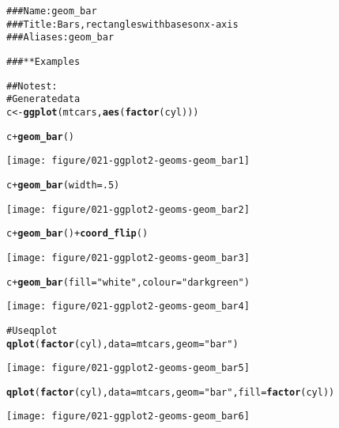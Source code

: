 \documentclass[a4paper,titlepage]{tufte-handout}\usepackage{graphicx, color}
\makeatletter
\def\maxwidth{ %
  \ifdim\Gin@nat@width>\linewidth
    \linewidth
  \else
    \Gin@nat@width
  \fi
}
\newcommand{\hlfunctioncall}[1]{\textcolor[rgb]{0.501960784313725,0,0.329411764705882}{\textbf{#1}}}%
\newcommand{\hlstring}[1]{\textcolor[rgb]{0.6,0.6,1}{#1}}%
\newcommand{\hlcomment}[1]{\textcolor[rgb]{0.180392156862745,0.6,0.341176470588235}{#1}}%
\newenvironment{kframe}{%
 \def\at@end@of@kframe{}%
 \ifinner\ifhmode%
  \def\at@end@of@kframe{\end{minipage}}%
  \begin{minipage}{\columnwidth}%
 \fi\fi%
 \def\FrameCommand##1{\hskip\@totalleftmargin \hskip-\fboxsep
 \colorbox{shadecolor}{##1}\hskip-\fboxsep
     \hskip-\linewidth \hskip-\@totalleftmargin \hskip\columnwidth}%
 \MakeFramed {\advance\hsize-\width
   \@totalleftmargin\z@ \linewidth\hsize
   \@setminipage}}%
 {\par\unskip\endMakeFramed%
 \at@end@of@kframe}
\newenvironment{knitrout}{}{} %
\makeatother
\begin{document}
\begin{knitrout}
\color{fgcolor}\begin{kframe}
\begin{alltt}
\hlcomment{### Name: geom_bar}
\hlcomment{### Title: Bars, rectangles with bases on x-axis}
\hlcomment{### Aliases: geom_bar}

\hlcomment{### ** Examples}

\hlcomment{## No test: }
\hlcomment{# Generate data}
c <- \hlfunctioncall{ggplot}(mtcars, \hlfunctioncall{aes}(\hlfunctioncall{factor}(cyl)))

c + \hlfunctioncall{geom_bar}()
\end{alltt}
\end{kframe}
\texttt{[image: figure/021-ggplot2-geoms-geom\_bar1]} 
\begin{kframe}\begin{alltt}
c + \hlfunctioncall{geom_bar}(width=.5)
\end{alltt}
\end{kframe}
\texttt{[image: figure/021-ggplot2-geoms-geom\_bar2]} 
\begin{kframe}\begin{alltt}
c + \hlfunctioncall{geom_bar}() + \hlfunctioncall{coord_flip}()
\end{alltt}
\end{kframe}
\texttt{[image: figure/021-ggplot2-geoms-geom\_bar3]} 
\begin{kframe}\begin{alltt}
c + \hlfunctioncall{geom_bar}(fill=\hlstring{"white"}, colour=\hlstring{"darkgreen"})
\end{alltt}
\end{kframe}
\texttt{[image: figure/021-ggplot2-geoms-geom\_bar4]} 
\begin{kframe}\begin{alltt}

\hlcomment{# Use qplot}
\hlfunctioncall{qplot}(\hlfunctioncall{factor}(cyl), data=mtcars, geom=\hlstring{"bar"})
\end{alltt}
\end{kframe}
\texttt{[image: figure/021-ggplot2-geoms-geom\_bar5]} 
\begin{kframe}\begin{alltt}
\hlfunctioncall{qplot}(\hlfunctioncall{factor}(cyl), data=mtcars, geom=\hlstring{"bar"}, fill=\hlfunctioncall{factor}(cyl))
\end{alltt}
\end{kframe}
\texttt{[image: figure/021-ggplot2-geoms-geom\_bar6]} 
\begin{kframe}\begin{alltt}


\end{alltt}
\end{kframe}
\end{knitrout}
\end{document}
